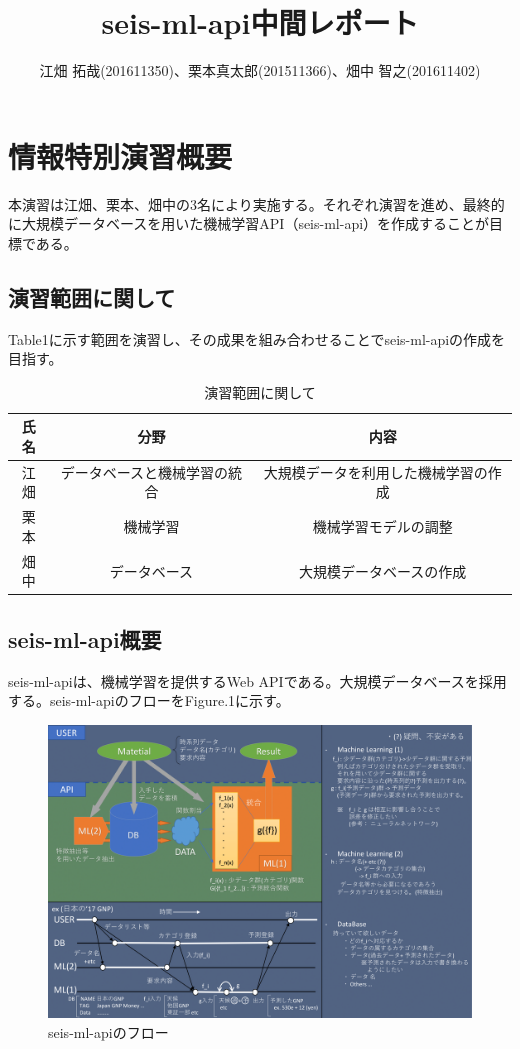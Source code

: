 \documentclass{scrartcl}
\author{江畑 拓哉(201611350)、栗本真太郎(201511366)、畑中 智之(201611402)}
\date{}
\title{seis-ml-api中間レポート}
\begin{document}
\maketitle
\tableofcontents

\section{情報特別演習概要}
\label{sec:org9f80ab5}
本演習は江畑、栗本、畑中の3名により実施する。それぞれ演習を進め、最終的に大規模データベースを用いた機械学習API（seis-ml-api）を作成することが目標である。\\

\subsection{演習範囲に関して}
\label{sec:org40df129}
Table1に示す範囲を演習し、その成果を組み合わせることでseis-ml-apiの作成を目指す。\\

\begin{table}[htbp]
\caption{演習範囲に関して}
\centering
\begin{tabular}{|c|c|c|}
\hline
氏名 & 分野 & 内容\\
\hline
江畑 & データベースと機械学習の統合 & 大規模データを利用した機械学習の作成\\
\hline
栗本 & 機械学習 & 機械学習モデルの調整\\
\hline
畑中 & データベース & 大規模データベースの作成\\

\hline
\end{tabular}
\end{table}

\subsection{seis-ml-api概要}
\label{sec:orgd312151}
seis-ml-apiは、機械学習を提供するWeb APIである。大規模データベースを採用する。seis-ml-apiのフローをFigure.1に示す。\\

\begin{figure}[htbp]
\centering
\includegraphics[width=15cm]{./idea-0-1.png}
\caption{seis-ml-apiのフロー}
\end{figure}
\end{document}
